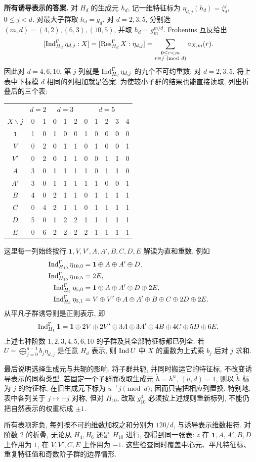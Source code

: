 \begin{solution}
\textbf{所有诱导表示的答案.}
对 $H_d$ 的生成元 $h_d$, 记一维特征标为 $\eta_{d,j}(h_d)=\zeta_d^j$, $0\le j<d$. 对最大子群取 $h_d=g_d$. 对 $d=2,3,5$, 分别选 $(m,d)=(4,2),(6,3),(10,5)$, 并取 $h_d=g_m^{m/d}$. Frobenius 互反给出
\[
 [\operatorname{Ind}_{H_d}^{\Gamma}\eta_{d,j}:X]
 =[\operatorname{Res}_{H_d}^{\Gamma}X:\eta_{d,j}]
 =\sum_{\substack{0\le r<m\\r\equiv j\ (\mathrm{mod}\ d)}} a_{X,m}(r).
\]
因此对 $d=4,6,10$, 第 $j$ 列就是 $\operatorname{Ind}_{H_d}^{\Gamma}\eta_{d,j}$ 的九个不可约重数; 对 $d=2,3,5$, 将上表中下标模 $d$ 相同的列相加就是答案. 为使较小子群的结果也能直接读取, 列出折叠后的三个表:
\begin{center}
\begin{tabular}{c|rr|rrr|rrrrr}
\toprule
&\multicolumn{2}{c|}{$d=2$}&\multicolumn{3}{c|}{$d=3$}&\multicolumn{5}{c}{$d=5$}\\
$X\backslash j$&0&1&0&1&2&0&1&2&3&4\\ \midrule
$\mathbf1$&1&0&1&0&0&1&0&0&0&0\\
$V$&0&2&0&1&1&0&1&0&0&1\\
$V'$&0&2&0&1&1&0&0&1&1&0\\
$A$&3&0&1&1&1&1&0&1&1&0\\
$A'$&3&0&1&1&1&1&1&0&0&1\\
$B$&4&0&2&1&1&0&1&1&1&1\\
$C$&0&4&2&1&1&0&1&1&1&1\\
$D$&5&0&1&2&2&1&1&1&1&1\\
$E$&0&6&2&2&2&2&1&1&1&1\\ \bottomrule
\end{tabular}
\end{center}
这里每一列始终按行 $\mathbf1,V,V',A,A',B,C,D,E$ 解读为直和重数. 例如
\begin{align*}
\operatorname{Ind}_{H_{10}}^{\Gamma}\eta_{10,0}&=\mathbf1\oplus A\oplus A'\oplus D,\\
\operatorname{Ind}_{H_{10}}^{\Gamma}\eta_{10,5}&=2E,\\
\operatorname{Ind}_{H_5}^{\Gamma}\eta_{5,0}&=\mathbf1\oplus A\oplus A'\oplus D\oplus2E,\\
\operatorname{Ind}_{H_3}^{\Gamma}\eta_{3,1}&=V\oplus V'\oplus A\oplus A'\oplus B\oplus C\oplus2D\oplus2E.
\end{align*}
从平凡子群诱导则是正则表示, 即
\[
 \operatorname{Ind}_{H_1}^{\Gamma}\mathbf1
 =\mathbf1\oplus2V\oplus2V'\oplus3A\oplus3A'
 \oplus4B\oplus4C\oplus5D\oplus6E.
\]
上述七种阶数 $1,2,3,4,5,6,10$ 的子群及其全部特征标都已列全. 若 $U=\bigoplus_{j=0}^{d-1}b_j\eta_{d,j}$ 是任意 $H_d$ 表示, 则 $\operatorname{Ind} U$ 中 $X$ 的重数为上式乘 $b_j$ 后对 $j$ 求和.

最后说明选择生成元与共轭的影响. 将子群共轭, 并同时搬运它的特征标, 不改变诱导表示的同构类型. 若固定一个子群而改取生成元 $\widetilde h=h^u$, $(u,d)=1$, 则以 $\widetilde h$ 标为 $j$ 的特征标, 在旧生成元下标为 $u^{-1}j\pmod d$; 因而只需把相应列置换. 特别地, 表中各列关于 $j\mapsto-j$ 对称, 但对 $H_{10}$, 改取 $g_{10}^3$ 必须按上述规则重新标列, 不能仍把自然表示的权重标成 $\pm1$.

所有表项非负, 每列按不可约维数加权之和分别为 $120/d$, 与诱导表示维数相符. 对阶数 $2$ 的折叠, 无论从 $H_4,H_6$ 还是 $H_{10}$ 进行, 都得到同一张表: $z$ 在 $\mathbf1,A,A',B,D$ 上作用为 $1$, 在 $V,V',C,E$ 上作用为 $-1$. 这些检查同时覆盖中心元、平凡特征标、重复特征值和奇数阶子群的边界情形.
\end{solution}
